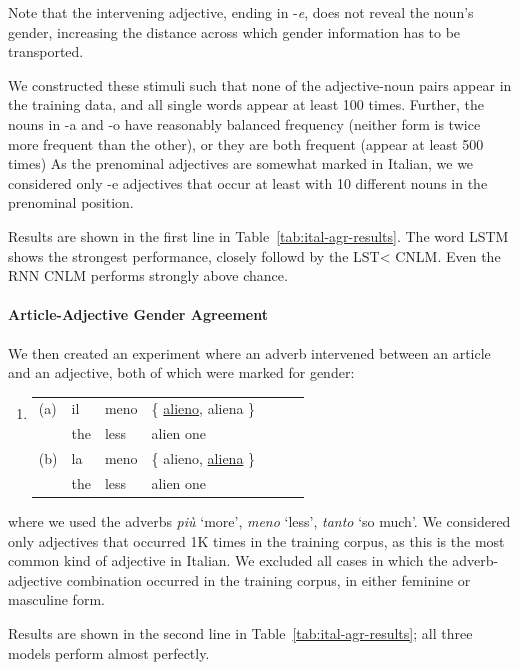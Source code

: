 Note that the intervening adjective, ending in -\emph{e}, does not reveal the noun's gender, increasing the distance across which gender information has to be transported.

We constructed these stimuli such that none of the adjective-noun pairs appear in the training data, and all single words appear at least 100 times.
Further, the nouns in -a and  -o have reasonably balanced frequency (neither form is twice more frequent than the other), or they are both frequent (appear at least 500 times)
As the prenominal adjectives are somewhat marked in Italian, we  we considered only -e adjectives that occur at least with 10 different nouns in the prenominal position.

Results are shown in the first line in Table~\ref{tab:ital-agr-results}.
The word LSTM shows the strongest performance, closely followd by the LST< CNLM.
Even the RNN CNLM performs strongly above chance.

\paragraph{Article-Adjective Gender Agreement}
We then created an experiment where an adverb intervened between an article and an adjective, both of which were marked for gender:
\begin{enumerate}[label={(\arabic*)}]
	\item 
		\begin{tabular}[t]{lllllll}
	(a) & il & meno & \{ \underline{alieno}, aliena \} \\
   &  the & less & alien one  \\
	(b) & la & meno & \{ alieno, \underline{aliena} \} \\
    &the & less & alien one \\
\end{tabular}
\end{enumerate}
where we used the adverbs \emph{pi{\`u}} `more', \emph{meno} `less', \emph{tanto} `so much'.
We considered only adjectives that occurred 1K times in the training corpus, as this is the most common kind of adjective in Italian.
We excluded all cases in which the adverb-adjective combination occurred in the training corpus, in either feminine or masculine form.



Results are shown in the second line in Table~\ref{tab:ital-agr-results}; all three models perform almost perfectly.

